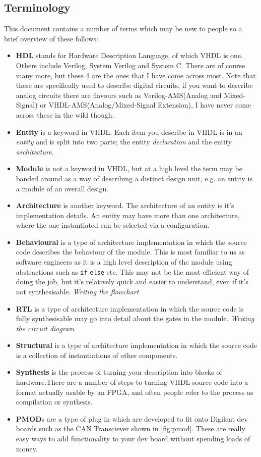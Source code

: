 \subsection{Terminology}
This document contains a number of terms which may be new to people so a brief overview of these follows:
\begin{itemize}
    \item \textbf{HDL} stands for Hardware Description Language, of which VHDL is one. Others include Verilog, System Verilog and System C. There are of course many more, but these 4 are the ones that I have come across most. Note that these are specifically used to describe digital circuits, if you want to describe analog circuits there are flavours such as Verilog-AMS(Analog and Mixed-Signal) or VHDL-AMS(Analog/Mixed-Signal Extension), I have never come across these in the wild though.
    \item \textbf{Entity} is a keyword in VHDL. Each item you describe in VHDL is in an \emph{entity} and is split into two parts; the entity \emph{declaration} and the entity \emph{architecture}.
    \item \textbf{Module} is not a keyword in VHDL, but at a high level the term may be banded around as a way of describing a distinct design unit, e.g. an entity is a module of an overall design.
    \item \textbf{Architecture} is another keyword. The architecture of an entity is it's implementation details. An entity may have more than one architecture, where the one instantiated can be selected via a configuration.
    \item \textbf{Behavioural} is a type of architecture implementation in which the source code describes the behaviour of the module. This is most familiar to us as software engineers as it is a high level description of the module using abstractions such as \texttt{if} \texttt{else} etc. This may not be the most efficient way of doing the job, but it's relatively quick and easier to understand, even if it's not synthesisable. \emph{Writing the flowchart}
    \item \textbf{RTL} is a type of architecture implementation in which the source code is fully synthesisable may go into detail about the gates in the module. \emph{Writing the circuit diagram}
    \item \textbf{Structural} is a type of architecture implementation in which the source code is a collection of instantiations of other components. 
    \item \textbf{Synthesis} is the process of turning your description into blocks of hardware.\handwaving There are a number of steps to turning VHDL source code into a format actually usable by an FPGA, and often people refer to the process as compilation or synthesis. 
    \item \textbf{PMOD}s are a type of plug in which are developed to fit onto Digilent dev boards such as the CAN Transciever shown in \cref{fig:pmod}. These are really easy ways to add functionality to your dev board without spending loads of money.
\end{itemize}

